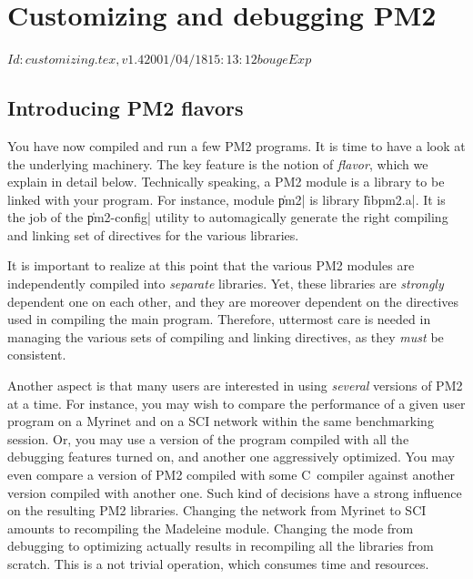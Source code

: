 \chapter{Customizing and debugging PM2}

\stamp $Id: customizing.tex,v 1.4 2001/04/18 15:13:12 bouge Exp $

\section{Introducing PM2 flavors}

You have now compiled and run a few PM2 programs. It is time to have a
look at the underlying machinery. The key feature is the notion of
\emph{flavor}, which we explain in detail below. Technically speaking,
a PM2 module is a library to be linked with your program. For
instance, module \|pm2| is library \|libpm2.a|. It is the job of the
\|pm2-config| utility to automagically generate the right compiling
and linking set of directives for the various libraries.

It is important to realize at this point that the various PM2 modules
are independently compiled into \emph{separate} libraries. Yet, these
libraries are \emph{strongly} dependent one on each other, and they
are moreover dependent on the directives used in compiling the main
program. Therefore, uttermost care is needed in managing the various
sets of compiling and linking directives, as they \emph{must} be
consistent. 

Another aspect is that many users are interested in using
\emph{several} versions of PM2 at a time. For instance, you may wish
to compare the performance of a given user program on a Myrinet and on
a SCI network within the same benchmarking session. Or, you may use a
version of the program compiled with all the debugging features turned
on, and another one aggressively optimized. You may even compare a
version of PM2 compiled with some C~compiler against another version
compiled with another one.  Such kind of decisions have a strong
influence on the resulting PM2 libraries. Changing the network from
Myrinet to SCI amounts to recompiling the Madeleine module.  Changing
the mode from debugging to optimizing actually results in recompiling
all the libraries from scratch. This is a not trivial operation, which
consumes time and resources.

